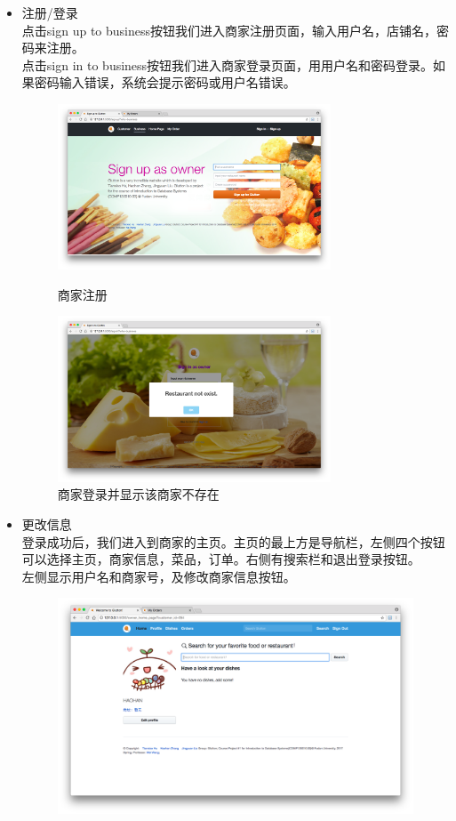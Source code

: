 \documentclass[12pt, oneside,a4paper]{article}
\begin{document}
  \begin{itemize}
  \item 注册/登录\\
  点击sign up to business按钮我们进入商家注册页面，输入用户名，店铺名，密码来注册。\\
  点击sign in to business按钮我们进入商家登录页面，用用户名和密码登录。如果密码输入错误，系统会提示密码或用户名错误。
  \begin{figure}[H]
   \begin{minipage}[t]{0.5\linewidth}
    \centering
     \includegraphics[width=3.2in]{re-signup.jpg}
     \caption{\small{商家注册}}
   \end{minipage}
   \begin{minipage}[t]{0.5\linewidth}
    \centering
     \includegraphics[width=3.2in]{re-signin.jpg}
      \caption{\small{商家登录并显示该商家不存在}}
   \end{minipage}
   \end{figure}
  \item 更改信息\\
  登录成功后，我们进入到商家的主页。主页的最上方是导航栏，左侧四个按钮可以选择主页，商家信息，菜品，订单。右侧有搜索栏和退出登录按钮。\\
  左侧显示用户名和商家号，及修改商家信息按钮。
  \begin{figure}[H]
   \centering
     \includegraphics[width=6.00in]{re-home1.jpg}

\end{figure}
\end{itemize}
\end{document}
